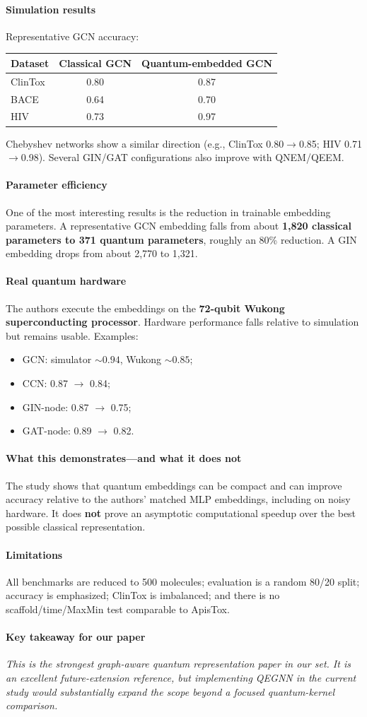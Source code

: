 \documentclass[11pt]{article}
\newcommand{\reviewfield}[2]{\paragraph{#1}#2}
\newcommand{\keytakeaway}[1]{\paragraph{Key takeaway for our paper}\emph{#1}}
\begin{document}
\reviewfield{Simulation results}{
Representative GCN accuracy:
\begin{center}
\begin{tabular}{lcc}
\toprule
Dataset & Classical GCN & Quantum-embedded GCN\\
\midrule
ClinTox & 0.80 & 0.87\\
BACE & 0.64 & 0.70\\
HIV & 0.73 & 0.97\\
\bottomrule
\end{tabular}
\end{center}
Chebyshev networks show a similar direction (e.g., ClinTox 0.80$\rightarrow$0.85; HIV 0.71$\rightarrow$0.98). Several GIN/GAT configurations also improve with QNEM/QEEM.
}

\reviewfield{Parameter efficiency}{
One of the most interesting results is the reduction in trainable embedding parameters. A representative GCN embedding falls from about \textbf{1,820 classical parameters to 371 quantum parameters}, roughly an 80\% reduction. A GIN embedding drops from about 2,770 to 1,321.
}

\reviewfield{Real quantum hardware}{
The authors execute the embeddings on the \textbf{72-qubit Wukong superconducting processor}. Hardware performance falls relative to simulation but remains usable. Examples:
\begin{itemize}
    \item GCN: simulator $\sim0.94$, Wukong $\sim0.85$;
    \item CCN: 0.87 $\rightarrow$ 0.84;
    \item GIN-node: 0.87 $\rightarrow$ 0.75;
    \item GAT-node: 0.89 $\rightarrow$ 0.82.
\end{itemize}
}

\reviewfield{What this demonstrates---and what it does not}{
The study shows that quantum embeddings can be compact and can improve accuracy relative to the authors' matched MLP embeddings, including on noisy hardware. It does \textbf{not} prove an asymptotic computational speedup over the best possible classical representation.
}

\reviewfield{Limitations}{
All benchmarks are reduced to 500 molecules; evaluation is a random 80/20 split; accuracy is emphasized; ClinTox is imbalanced; and there is no scaffold/time/MaxMin test comparable to ApisTox.
}

\keytakeaway{This is the strongest graph-aware quantum representation paper in our set. It is an excellent future-extension reference, but implementing QEGNN in the current study would substantially expand the scope beyond a focused quantum-kernel comparison.}
\end{document}
